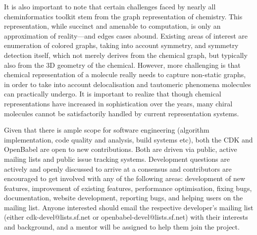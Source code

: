 \documentclass{sig-alternate}
\begin{document}
It is also important to note that certain challenges faced by nearly
all cheminformatics toolkit stem from the graph representation of
chemistry. This representation, while succinct and amenable to
computation, is only an approximation of reality---and edges cases
abound. Existing areas of interest are enumeration of colored graphs,
taking into account symmetry, and symmetry detection itself, which not
merely derives from the chemical graph, but typically also from the 3D
geometry of the chemical. However, more challenging is that chemical
representation of a molecule really needs to capture non-static
graphs, in order to take into account delocalisation and tautomeric
phenomena molecules can practically undergo. It is important to
realize that though chemical representations have increased in
sophistication over the years, many chiral molecules cannot be
satisfactorily handled by current representation systems.


Given that there is ample scope for software engineering (algorithm
implementation, code quality and analysis, build systems etc), both
the CDK and OpenBabel are open to new contributions. Both are driven
via public, active mailing lists and public issue tracking systems.
Development questions are actively and openly discussed to arrive at a
consensus and contributors are encouraged to get involved with any of
the following areas: development of new features, improvement of
existing features, performance optimisation, fixing bugs,
documentation, website development, reporting bugs, and helping users
on the mailing list. Anyone interested should email the respective
developer's mailing list (either cdk-devel@lists.sf.net or
openbabel-devel@lists.sf.net) with their interests and background, and
a mentor will be assigned to help them join the project.
\end{document}
